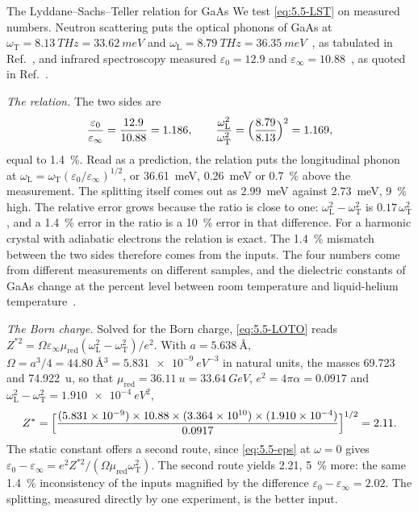 \begin{workedexample}{The Lyddane--Sachs--Teller relation for GaAs}\label{we:5-lst}
We test \cref{eq:5.5-LST} on measured numbers. Neutron scattering puts the optical phonons of GaAs at $\omega_{\mathrm{T}} = \SI{8.13}{THz} = \SI{33.62}{meV}$ and $\omega_{\mathrm{L}} = \SI{8.79}{THz} = \SI{36.35}{meV}$~\cite{strauch1990phonon}, as tabulated in Ref.~\cite[Table~I]{dehghani2025influence}, and infrared spectroscopy measured $\varepsilon_0 = 12.9$ and $\varepsilon_\infty = 10.88$~\cite{lockwood2005optical}, as quoted in Ref.~\cite{knapen2018detection}.

\emph{The relation.} The two sides are
\begin{equation*}
  \frac{\varepsilon_0}{\varepsilon_\infty} = \frac{12.9}{10.88} = 1.186 , \qquad
  \frac{\omega_{\mathrm{L}}^2}{\omega_{\mathrm{T}}^2} = \Bigl(\frac{8.79}{8.13}\Bigr)^2 = 1.169 ,
\end{equation*}
equal to \SI{1.4}{\percent}. Read as a prediction, the relation puts the longitudinal phonon at $\omega_{\mathrm{L}} = \omega_{\mathrm{T}}(\varepsilon_0/\varepsilon_\infty)^{1/2}$, or \SI{36.61}{meV}, \SI{0.26}{meV} or \SI{0.7}{\percent} above the measurement. The splitting itself comes out as \SI{2.99}{meV} against \SI{2.73}{meV}, \SI{9}{\percent} high. The relative error grows because the ratio is close to one: $\omega_{\mathrm{L}}^2 - \omega_{\mathrm{T}}^2$ is $0.17\,\omega_{\mathrm{T}}^2$, and a \SI{1.4}{\percent} error in the ratio is a \SI{10}{\percent} error in that difference. For a harmonic crystal with adiabatic electrons the relation is exact. The \SI{1.4}{\percent} mismatch between the two sides therefore comes from the inputs. The four numbers come from different measurements on different samples, and the dielectric constants of GaAs change at the percent level between room temperature and liquid-helium temperature~\cite{griffin2018directional}.

\emph{The Born charge.} Solved for the Born charge, \cref{eq:5.5-LOTO} reads $Z^{*2} = \Omega\varepsilon_\infty\mu_{\mathrm{red}}(\omega_{\mathrm{L}}^2 - \omega_{\mathrm{T}}^2)/e^2$. With $a = \SI{5.638}{\angstrom}$, $\Omega = a^3/4 = \SI{44.80}{\angstrom^3} = \SI{5.831e-9}{eV^{-3}}$ in natural units, the masses 69.723 and \SI{74.922}{u}, so that $\mu_{\mathrm{red}} = \SI{36.11}{u} = \SI{33.64}{GeV}$, $e^2 = 4\pi\alpha = 0.0917$ and $\omega_{\mathrm{L}}^2 - \omega_{\mathrm{T}}^2 = \SI{1.910e-4}{eV^2}$,
\begin{equation*}
  Z^* = \Bigl[\frac{(5.831\times10^{-9})\times10.88\times(3.364\times10^{10})\times(1.910\times10^{-4})}{0.0917}\Bigr]^{1/2} = 2.11 .
\end{equation*}
The static constant offers a second route, since \cref{eq:5.5-eps} at $\omega = 0$ gives $\varepsilon_0 - \varepsilon_\infty = e^2Z^{*2}/(\Omega\mu_{\mathrm{red}}\omega_{\mathrm{T}}^2)$. The second route yields 2.21, \SI{5}{\percent} more: the same \SI{1.4}{\percent} inconsistency of the inputs magnified by the difference $\varepsilon_0 - \varepsilon_\infty = 2.02$. The splitting, measured directly by one experiment, is the better input.


\end{workedexample}
